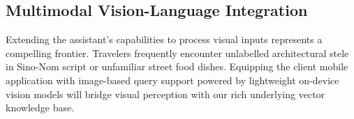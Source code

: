 \subsection{Multimodal Vision-Language Integration}
Extending the assistant's capabilities to process visual inputs represents a compelling frontier. Travelers frequently encounter unlabelled architectural stele in Sino-Nom script or unfamiliar street food dishes. Equipping the client mobile application with image-based query support powered by lightweight on-device vision models will bridge visual perception with our rich underlying vector knowledge base.
